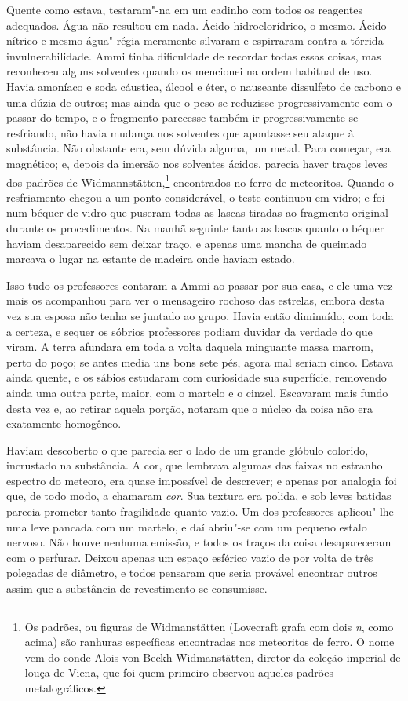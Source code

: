 Quente como estava, testaram"-na em um cadinho com todos os reagentes
adequados. Água não resultou em nada. Ácido hidroclorídrico, o mesmo.
Ácido nítrico e mesmo água"-régia meramente silvaram e espirraram contra
a tórrida invulnerabilidade. Ammi tinha dificuldade de recordar todas
essas coisas, mas reconheceu alguns solventes quando os mencionei na
ordem habitual de uso. Havia amoníaco e soda cáustica, álcool e éter, o
nauseante dissulfeto de carbono e uma dúzia de outros; mas ainda que o
peso se reduzisse progressivamente com o passar do tempo, e o fragmento
parecesse também ir progressivamente se resfriando, não havia mudança
nos solventes que apontasse seu ataque à substância. Não obstante era,
sem dúvida alguma, um metal. Para começar, era magnético; e, depois da
imersão nos solventes ácidos, parecia haver traços leves dos padrões de
Widmannstätten,\footnote{Os padrões, ou figuras de Widmanstätten
  (Lovecraft grafa com dois \textit{n}, como acima) são ranhuras específicas
  encontradas nos meteoritos de ferro. O nome vem do conde Alois von
  Beckh Widmanstätten, diretor da coleção imperial de louça de Viena,
  que foi quem primeiro observou aqueles padrões metalográficos.}
encontrados no ferro de meteoritos. Quando o resfriamento chegou a um
ponto considerável, o teste continuou em vidro; e foi num béquer de
vidro que puseram todas as lascas tiradas ao fragmento original durante
os procedimentos. Na manhã seguinte tanto as lascas quanto o béquer
haviam desaparecido sem deixar traço, e apenas uma mancha de queimado
marcava o lugar na estante de madeira onde haviam estado.

Isso tudo os professores contaram a Ammi ao passar por sua casa, e ele
uma vez mais os acompanhou para ver o mensageiro rochoso das estrelas,
embora desta vez sua esposa não tenha se juntado ao grupo. Havia então
diminuído, com toda a certeza, e sequer os sóbrios professores podiam
duvidar da verdade do que viram. A terra afundara em toda a volta
daquela minguante massa marrom, perto do poço; se antes media uns bons
sete pés, agora mal seriam cinco. Estava ainda quente, e os sábios
estudaram com curiosidade sua superfície, removendo ainda uma outra
parte, maior, com o martelo e o cinzel. Escavaram mais fundo desta vez
e, ao retirar aquela porção, notaram que o núcleo da coisa não era
exatamente homogêneo.

Haviam descoberto o que parecia ser o lado de um grande glóbulo
colorido, incrustado na substância. A cor, que lembrava algumas das
faixas no estranho espectro do meteoro, era quase impossível de
descrever; e apenas por analogia foi que, de todo modo, a chamaram
\textit{cor}. Sua textura era polida, e sob leves batidas parecia prometer
tanto fragilidade quanto vazio. Um dos professores aplicou"-lhe uma leve
pancada com um martelo, e daí abriu"-se com um pequeno estalo nervoso.
Não houve nenhuma emissão, e todos os traços da coisa desapareceram com
o perfurar. Deixou apenas um espaço esférico vazio de por volta de três
polegadas de diâmetro, e todos pensaram que seria provável encontrar
outros assim que a substância de revestimento se consumisse.

